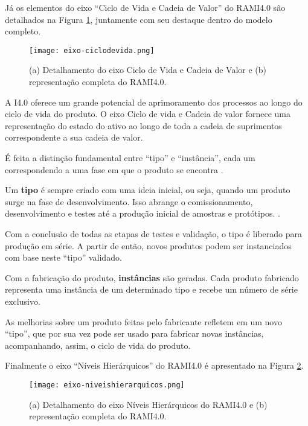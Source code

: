 	Já os elementos do eixo ``Ciclo de Vida e Cadeia de Valor'' do RAMI4.0 são detalhados na Figura \ref{fig:eixo-ciclodevida}, juntamente com seu destaque dentro do modelo completo.
	
	\begin{figure}[hbt!]
		\centering
		\caption{(a) Detalhamento do eixo Ciclo de Vida e Cadeia de Valor e (b) representação completa do RAMI4.0.}
		\texttt{[image: eixo-ciclodevida.png]}
		\label{fig:eixo-ciclodevida}
	\end{figure}


	A I4.0 oferece um grande potencial de aprimoramento dos processos ao longo do ciclo de vida do produto. O eixo Ciclo de vida e Cadeia de valor fornece uma representação do estado do ativo ao longo de toda a cadeia de suprimentos correspondente a sua cadeia de valor. 
	
	É feita a distinção fundamental entre ``tipo'' e ``instância'', cada um correspondendo a uma fase em que o produto se encontra \cite{adolphs2015rami}.
	
	Um \textbf{tipo} é sempre criado com uma ideia inicial, ou seja, quando um produto surge na fase de desenvolvimento. Isso abrange o comissionamento, desenvolvimento e testes até a produção inicial de amostras e protótipos. \cite{adolph2018roadmap}. 
	
	Com a conclusão de todas as etapas de testes e validação, o tipo é liberado para produção em série. A partir de então, novos produtos podem ser instanciados com base neste ``tipo'' validado. 
	
	Com a fabricação do produto, \textbf{instâncias} são geradas. Cada produto fabricado representa uma instância de um determinado tipo e recebe um número de série exclusivo.
	
	As melhorias sobre um produto feitas pelo fabricante refletem em um novo ``tipo'', que por sua vez pode ser usado para fabricar novas instâncias, acompanhando, assim, o ciclo de vida do produto.

	Finalmente o eixo ``Níveis Hierárquicos'' do RAMI4.0 é apresentado na Figura \ref{fig:eixo-niveishierarquicos}.
	
	\begin{figure}[hbt!]
		\centering
		\caption{(a) Detalhamento do eixo Níveis Hierárquicos do RAMI4.0 e (b) representação completa do RAMI4.0.}
		\texttt{[image: eixo-niveishierarquicos.png]}
		\label{fig:eixo-niveishierarquicos}
	\end{figure}

